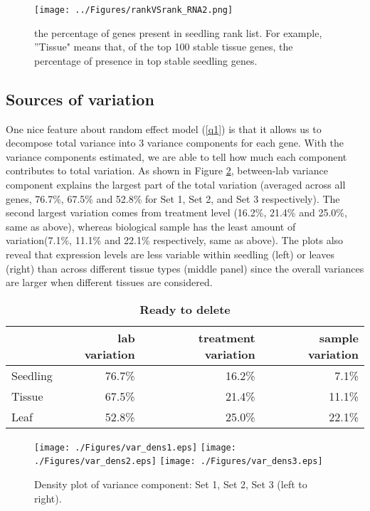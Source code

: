 \documentclass[11pt, a4paper]{article}
\begin{document}
 \begin{figure}[h!]
 	\begin{center}
 		\texttt{[image: ../Figures/rankVSrank\_RNA2.png]}
 		\label{fig:rankVSrank_RNA}
 		\caption{ the percentage of genes present in seedling rank list. For example, ''Tissue" means that, of the top 100 stable tissue genes, the percentage of presence in top stable seedling genes.}
 	\end{center}
 \end{figure}

  \subsection{Sources of variation}
 One nice feature about random effect model (\ref{q1}) is that it allows us to decompose total variance into 3 variance components for each gene. With the variance components estimated, we are able to tell how much each component contributes to total variation.  As shown in Figure \ref{densityplot}, between-lab variance component explains the largest part of the total variation (averaged across all genes, 76.7\%, 67.5\% and 52.8\%  for Set 1, Set 2, and Set 3 respectively).  The second largest variation comes from treatment level (16.2\%, 21.4\% and 25.0\%, same as above), whereas biological sample has the least amount of variation(7.1\%, 11.1\% and 22.1\% respectively, same as above).  The plots also reveal that expression levels are less variable within seedling (left) or leaves (right) than across different tissue types (middle panel) since the overall variances are larger when different tissues are considered.  


\begin{center}
\begin{table}[h]
\centering
\begin{tabular}{lrrr} \hline
&lab variation & treatment variation & sample variation  \\  \hline
Seedling  &76.7\% &16.2\% &7.1\%  \\
   Tissue  &67.5\% &21.4\% &11.1\%  \\
     Leaf   &52.8\% &25.0\% &22.1\% \\ \hline
\end{tabular}
\caption{\textbf{Ready to delete}}
\label{table:percentageofvariation}
\end{table}
\end{center} 
 


 
 \begin{figure}[h]
\begin{center}
\texttt{[image: ./Figures/var\_dens1.eps]}
\texttt{[image: ./Figures/var\_dens2.eps]}
\texttt{[image: ./Figures/var\_dens3.eps]}
\caption{\label{densityplot} Density plot of variance component: Set 1, Set 2, Set 3 (left to right).}
\end{center}
\end{figure} 
\end{document}
